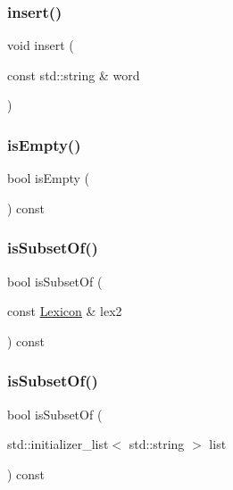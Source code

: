 \subsubsection{\texorpdfstring{insert()}{insert()}}
{\footnotesize\ttfamily void insert (\begin{DoxyParamCaption}\item[{const std\+::string \&}]{word }\end{DoxyParamCaption})}

\mbox{\label{classLexicon_acf82f9b2937375c7b1cf3dccb3df3312}} 
\subsubsection{\texorpdfstring{is\+Empty()}{isEmpty()}}
{\footnotesize\ttfamily bool is\+Empty (\begin{DoxyParamCaption}{ }\end{DoxyParamCaption}) const}

\mbox{\label{classLexicon_a6c118f41dad8941a624c3ff479987e3d}} 
\subsubsection{\texorpdfstring{is\+Subset\+Of()}{isSubsetOf()}\hspace{0.1cm}{\footnotesize\ttfamily [1/2]}}
{\footnotesize\ttfamily bool is\+Subset\+Of (\begin{DoxyParamCaption}\item[{const \mbox{\hyperlink{classLexicon}{Lexicon}} \&}]{lex2 }\end{DoxyParamCaption}) const}

\mbox{\label{classLexicon_a2a0f1241b53bcf0b31103b79cb01b87d}} 
\subsubsection{\texorpdfstring{is\+Subset\+Of()}{isSubsetOf()}\hspace{0.1cm}{\footnotesize\ttfamily [2/2]}}
{\footnotesize\ttfamily bool is\+Subset\+Of (\begin{DoxyParamCaption}\item[{std\+::initializer\+\_\+list$<$ std\+::string $>$}]{list }\end{DoxyParamCaption}) const}

